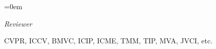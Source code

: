 \documentclass{scrartcl}
\newlength{\datebox}\settowidth{\datebox}{Spring 2014} %
\newcommand{\NewEntry}[3]{\noindent\hangindent=0em\hangafter=0 \parbox{\datebox}{\small \textit{#1}}\hspace{1.5em} #2 #3 %
\vspace{0.5em}} %
\begin{document}
\begin{cv}{}

\vspace{0.8em}

\NewEntry{Reviewer}{CVPR, ICCV, BMVC, ICIP, ICME, TMM, TIP, MVA, JVCI, etc.}

\vspace{2.0em} %

\end{cv}
\end{document}
